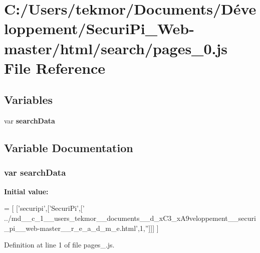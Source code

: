\section{C\+:/\+Users/tekmor/\+Documents/\+Développement/\+Securi\+Pi\+\_\+\+Web-\/master/html/search/pages\+\_\+0.js File Reference}
\label{pages__0_8js}
\subsection*{Variables}
\begin{DoxyCompactItemize}
\item 
var {\bf search\+Data}
\end{DoxyCompactItemize}


\subsection{Variable Documentation}
\subsubsection[{search\+Data}]{\setlength{\rightskip}{0pt plus 5cm}var search\+Data}\label{pages__0_8js_ad01a7523f103d6242ef9b0451861231e}
{\bfseries Initial value\+:}
\begin{DoxyCode}
=
[
  [\textcolor{stringliteral}{'securipi'},[\textcolor{stringliteral}{'SecuriPi'},[\textcolor{stringliteral}{'
      ../md\_\_c\_1\_\_users\_tekmor\_\_documents\_\_d\_xC3\_xA9veloppement\_\_securi\_pi\_\_web-master\_\_r\_e\_a\_d\_m\_e.html'},1,\textcolor{stringliteral}{''}]]]
]
\end{DoxyCode}


Definition at line 1 of file pages\+\_.\+js.

